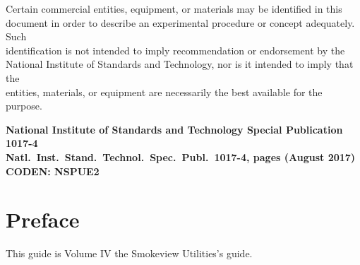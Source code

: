 \documentclass[11pt,twoside]{book}
\begin{document}
\begin{minipage}[t][9in][s]{6.5in}


\begin{flushright}
Certain commercial entities, equipment, or materials may be identified in this \\
document in order to describe an experimental procedure or concept adequately. Such \\
identification is not intended to imply recommendation or endorsement by the \\
National Institute of Standards and Technology, nor is it intended to imply that the \\
entities, materials, or equipment are necessarily the best available for the purpose.
\end{flushright}

\vspace{3in}


\vspace{3in}

\large
\begin{flushright}
\bf National Institute of Standards and Technology Special Publication 1017-4 \\
Natl.~Inst.~Stand.~Technol.~Spec.~Publ.~1017-4, \pageref{LastPage} pages (August 2017) \\
CODEN: NSPUE2
\end{flushright}

\vfill

\end{minipage}


\frontmatter

\pagestyle{plain}


\chapter{Preface}
\smvoverviewb
This guide is Volume IV the  Smokeview Utilities's guide.

\end{document}
